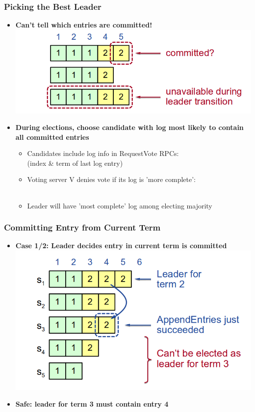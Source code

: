 \begin{frame}
    \frametitle{Picking the Best Leader}
    \begin{itemize}
        \item \textbf{Can't tell which entries are committed!}
        \includegraphics[scale=0.3]{./figures/raft-picking-leader.png}
        \item \textbf{During elections, choose candidate with log most likely to contain all committed entries}
            \begin{itemize}
                \item Candidates include log info in RequestVote RPCs: \\
                    (index \& term of last log entry)
                \item Voting server V denies vote if its log is 'more complete': \\
                    {\color{blue}{$(lastTerm_V > lastTerm_C) \|$}}  \\
                    {\color{blue}{$(lastTerm_V == lastTerm_C) \&\& (lastIndex_V > lastIndex_C)$}}
                \item Leader will have 'most complete' log among electing majority
            \end{itemize}
    \end{itemize}
\end{frame}

\begin{frame}
    \frametitle{Committing Entry from Current Term}
    \begin{itemize}
        \item \textbf{Case 1/2: Leader decides entry in current term is committed}
        \includegraphics[scale=0.3]{./figures/raft-commit-entry.png}
        \item \textbf{Safe: leader for term 3 must contain entry 4}
    \end{itemize}
\end{frame}


